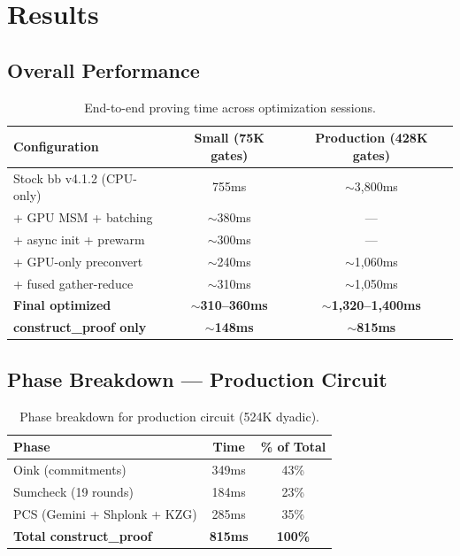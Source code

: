 \documentclass[11pt,a4paper]{article}
\begin{document}
\section{Results}

\subsection{Overall Performance}

\begin{table}[H]
\centering
\begin{tabular}{lcc}
\toprule
\textbf{Configuration} & \textbf{Small (75K gates)} & \textbf{Production (428K gates)} \\
\midrule
Stock bb v4.1.2 (CPU-only) & 755ms & $\sim$3,800ms \\
+ GPU MSM + batching & $\sim$380ms & --- \\
+ async init + prewarm & $\sim$300ms & --- \\
+ GPU-only preconvert & $\sim$240ms & $\sim$1,060ms \\
+ fused gather-reduce & $\sim$310ms & $\sim$1,050ms \\
\textbf{Final optimized} & \textbf{$\sim$310--360ms} & \textbf{$\sim$1,320--1,400ms} \\
\textbf{construct\_proof only} & \textbf{$\sim$148ms} & \textbf{$\sim$815ms} \\
\bottomrule
\end{tabular}
\caption{End-to-end proving time across optimization sessions.}
\end{table}

\subsection{Phase Breakdown --- Production Circuit}

\begin{table}[H]
\centering
\begin{tabular}{lcc}
\toprule
\textbf{Phase} & \textbf{Time} & \textbf{\% of Total} \\
\midrule
Oink (commitments) & 349ms & 43\% \\
Sumcheck (19 rounds) & 184ms & 23\% \\
PCS (Gemini + Shplonk + KZG) & 285ms & 35\% \\
\midrule
\textbf{Total construct\_proof} & \textbf{815ms} & \textbf{100\%} \\
\bottomrule
\end{tabular}
\caption{Phase breakdown for production circuit (524K dyadic).}
\end{table}
\end{document}
